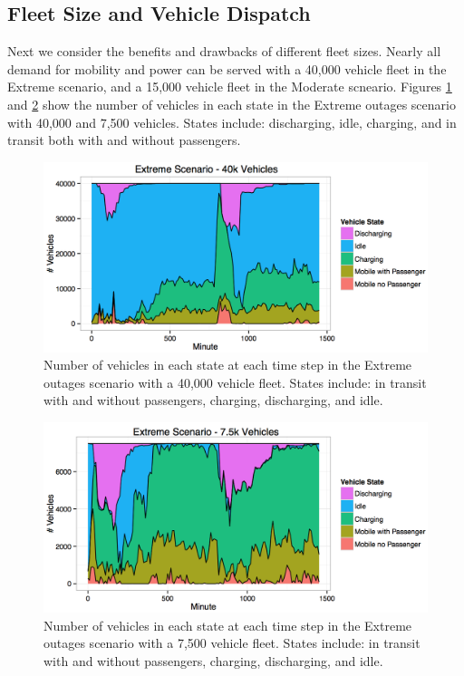 \documentclass[conference]{IEEEtran}
\begin{document}
\subsection{Fleet Size and Vehicle Dispatch}
Next we consider the benefits and drawbacks of different fleet sizes. Nearly all demand for mobility and power can be served with a 40,000 vehicle fleet in the Extreme scenario, and a 15,000 vehicle fleet in the Moderate scneario. Figures \ref{fig:time_extreme_40k} and \ref{fig:time_extreme_7500} show the number of vehicles in each state in the Extreme outages scenario with 40,000 and 7,500 vehicles. States include: discharging, idle, charging, and in transit both with and without passengers. 
\begin{figure}[!htbp]
  \begin{center}
  \includegraphics[width=\linewidth]{plots/states-area-40k-reverse.png}
  \end{center}
  \vspace{-5pt}
  \caption{Number of vehicles in each state at each time step in the Extreme outages scenario with a 40,000 vehicle fleet. States include: in transit with and without passengers, charging, discharging, and idle.}
  \label{fig:time_extreme_40k}
\end{figure}
\begin{figure}[!htbp]
  \begin{center}
  \includegraphics[width=\linewidth]{plots/states-area-7500-reverse.png}
  \end{center}
  \vspace{-5pt}
  \caption{Number of vehicles in each state at each time step in the Extreme outages scenario with a 7,500 vehicle fleet. States include: in transit with and without passengers, charging, discharging, and idle.}
  \label{fig:time_extreme_7500}
\end{figure}
\end{document}
